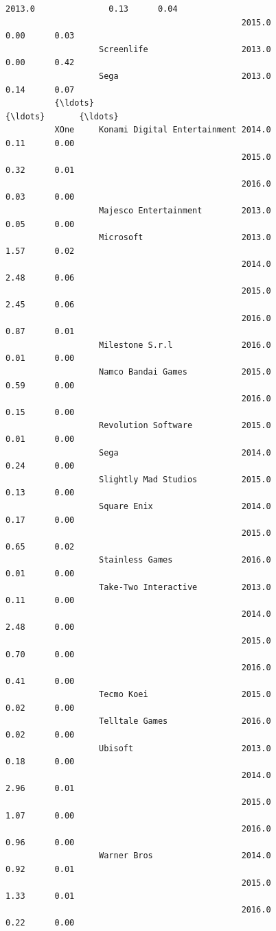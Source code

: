 \documentclass[11pt]{article}
\begin{document}
\begin{Verbatim}[commandchars=\\\{\}]
                                                2013.0               0.13      0.04   
                                                2015.0               0.00      0.03   
                   Screenlife                   2013.0               0.00      0.42   
                   Sega                         2013.0               0.14      0.07   
          {\ldots}                                                         {\ldots}       {\ldots}   
          XOne     Konami Digital Entertainment 2014.0               0.11      0.00   
                                                2015.0               0.32      0.01   
                                                2016.0               0.03      0.00   
                   Majesco Entertainment        2013.0               0.05      0.00   
                   Microsoft                    2013.0               1.57      0.02   
                                                2014.0               2.48      0.06   
                                                2015.0               2.45      0.06   
                                                2016.0               0.87      0.01   
                   Milestone S.r.l              2016.0               0.01      0.00   
                   Namco Bandai Games           2015.0               0.59      0.00   
                                                2016.0               0.15      0.00   
                   Revolution Software          2015.0               0.01      0.00   
                   Sega                         2014.0               0.24      0.00   
                   Slightly Mad Studios         2015.0               0.13      0.00   
                   Square Enix                  2014.0               0.17      0.00   
                                                2015.0               0.65      0.02   
                   Stainless Games              2016.0               0.01      0.00   
                   Take-Two Interactive         2013.0               0.11      0.00   
                                                2014.0               2.48      0.00   
                                                2015.0               0.70      0.00   
                                                2016.0               0.41      0.00   
                   Tecmo Koei                   2015.0               0.02      0.00   
                   Telltale Games               2016.0               0.02      0.00   
                   Ubisoft                      2013.0               0.18      0.00   
                                                2014.0               2.96      0.01   
                                                2015.0               1.07      0.00   
                                                2016.0               0.96      0.00   
                   Warner Bros                  2014.0               0.92      0.01   
                                                2015.0               1.33      0.01   
                                                2016.0               0.22      0.00   
          

\end{Verbatim}
\end{document}

